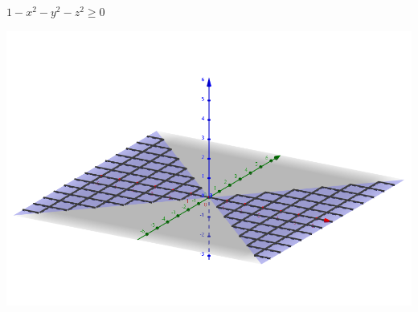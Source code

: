 \documentclass[../practica_02.tex]{subfiles}
\begin{document}
\begin{enumerate}
            $ 1-x^2-y^2-z^2 \geq 0 $

            \includegraphics[scale=0.4]{ej13/resources/b.png} $ $

    \end{enumerate}
\end{document}
